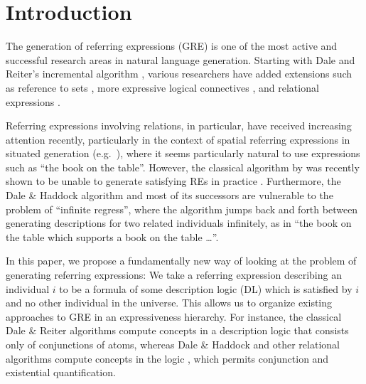 \section{Introduction} \label{sec:introduction}

The generation of referring expressions (GRE) is one of the most
active and successful research areas in natural language generation.
Starting with Dale and Reiter's incremental algorithm \cite{Dale1995},
various researchers have added extensions such as reference to sets
\cite{Stone2000}, more expressive logical connectives
\cite{deemter01:_gener_refer_expres}, and relational expressions
\cite{dale91:_gener_refer_expres_invol_relat}.

Referring expressions involving relations, in particular, have
received increasing attention recently, particularly in the context of
spatial referring expressions in situated generation (e.g.\
\cite{kelleher06:_increm_gener_of_spatial_refer}), where it seems
particularly natural to use expressions such as ``the book on the
table''.  However, the classical algorithm by
 was recently shown to
be unable to generate satisfying REs in practice
\cite{viethen06:_algor_for_gener_refer_expres}.  Furthermore, the Dale
\& Haddock algorithm and most of its successors
\cite{Krahmer2003,kelleher06:_increm_gener_of_spatial_refer} are
vulnerable to the problem of ``infinite regress'', where the algorithm
jumps back and forth between generating descriptions for two related
individuals infinitely, as in ``the book on the table which supports a
book on the table \ldots''.

In this paper, we propose a fundamentally new way of looking at the
problem of generating referring expressions: We take a referring
expression describing an individual $i$ to be a formula of some
description logic (DL) which is satisfied by $i$ and no other
individual in the universe.  This allows us to organize existing
approaches to GRE in an expressiveness hierarchy.  For instance, the
classical Dale \& Reiter algorithms compute concepts in a description
logic that consists only of conjunctions of atoms, whereas Dale \&
Haddock and other relational algorithms compute concepts in the logic
\el, which permits conjunction and existential quantification.

